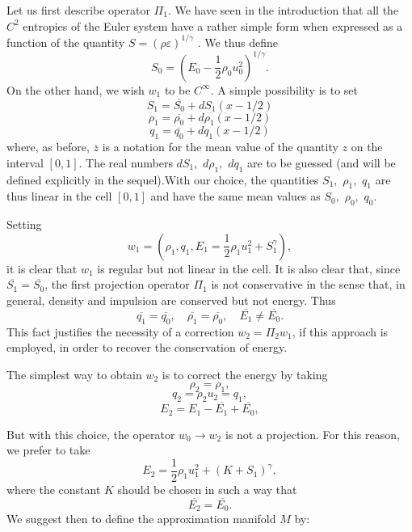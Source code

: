 \documentclass{fldauth}
\theoremstyle{plain}
\theoremstyle{plain}
\theoremstyle{plain}
\theoremstyle{plain}
\theoremstyle{plain}
\theoremstyle{plain}
\begin{document}
Let us first describe operator \( \Pi _{1}. \) We have seen in the introduction
that all the \( C^{2} \) entropies of the Euler system have a rather simple
form when expressed as a function of the quantity \( S=(\rho \varepsilon )^{1/\gamma } \)
. We thus define
\[
S_{0}=(E_{0}-\frac{1}{2}\rho _{0}u_{0}^{2})^{1/\gamma }.\]
On the other hand, we wish \( w_{1} \) to be \( C^{\infty } \). A simple possibility
is to set
\begin{equation}
\label{defS1}
S_{1}=\overline{S_{0}}+dS_{1}(x-1/2)
\end{equation}
\begin{equation}
\label{defrho1}
\rho _{1}=\overline{\rho _{0}}+d\rho _{1}(x-1/2)
\end{equation}
\begin{equation}
\label{defq1}
q_{1}=\overline{q_{0}}+dq_{1}(x-1/2)
\end{equation}
where, as before, \( \overline{z} \) is a notation for the mean value of the
quantity \( z \) on the interval \( [0,1]. \) The real numbers \( dS_{1}, \)
\( d\rho _{1}, \) \( dq_{1} \) are to be guessed (and will be defined explicitly
in the sequel).With our choice, the quantities \( S_{1}, \) \( \rho _{1}, \)
\( q_{1} \) are thus linear in the cell \( [0,1] \) and have the same mean
values as \( S_{0}, \) \( \rho _{0}, \) \( q_{0} \).

Setting
\begin{equation}
\label{defw1}
w_{1}=(\rho _{1},q_{1},E_{1}=\frac{1}{2}\rho _{1}u^{2}_{1}+S_{1}^{\gamma }),
\end{equation}
 it is clear that \( w_{1} \) is regular but not linear in the cell. It is
also clear that, since \( \overline{S_{1}}=\overline{S_{0}} \), the first projection
operator \( \Pi _{1} \) is not conservative in the sense that, in general,
density and impulsion are conserved but not energy. Thus
\[
\overline{q_{1}}=\overline{q_{0}},\quad \overline{\rho _{1}}=\overline{\rho _{0}},\quad \overline{E_{1}}\neq \overline{E_{0}}.\]
This fact justifies the necessity of a correction \( w_{2}=\Pi _{2}w_{1} \),
if this approach is employed, in order to recover the conservation of energy.

The simplest way to obtain \( w_{2} \) is to correct the energy by taking
\[
\rho _{2}=\rho _{1},\]
\[
q_{2}=\rho _{2}u_{2}=q_{1},\]
\[
E_{2}=E_{1}-\overline{E_{1}}+\overline{E_{0}},\]


But with this choice, the operator \( w_{0}\rightarrow w_{2} \) is not a projection.
For this reason, we prefer to take
\begin{equation}
\label{correcE}
E_{2}=\frac{1}{2}\rho _{1}u^{2}_{1}+(K+S_{1})^{\gamma },
\end{equation}
where the constant \( K \) should be chosen in such a way that
\begin{equation}
\label{conservE}
\overline{E_{2}}=\overline{E_{0}}.
\end{equation}
We suggest then to define the approximation manifold \( M \) by:
\end{document}
